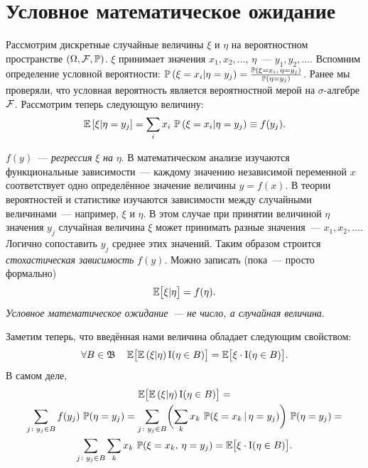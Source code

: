 \section{Условное математическое ожидание}
    Рассмотрим дискретные случайные величины $\xi$ и $\eta$ на вероятностном пространстве $(\Omega, \mathcal{F}, \operatorname{\mathbb{P}})$. 
    $\xi$ принимает значения $x_1, x_2, \dots$, $\eta$~--- $y_1, y_2, \dots$.
    Вспомним определение условной вероятности: ${\operatorname{\mathbb{P}}\left( \xi = x_i | \eta = y_j \right) = \frac{\operatorname{\mathbb{P}}\left( \xi = x_i, \, \eta = y_j\right)}{\operatorname{\mathbb{P}}\left(\eta = y_j\right)}}$.
    Ранее мы проверяли, что условная вероятность является вероятностной мерой на $\sigma$-алгебре $\mathcal{F}$.
    Рассмотрим теперь следующую величину:
    \begin{equation}
        \operatorname{\mathbb{E}} \left[ \xi | \eta = y_j \right] =
        \sum\limits_i x_i \, \operatorname{\mathbb{P}}\left(\xi = x_i | \eta = y_j \right) \equiv
        f(y_j).
        \label{cond_exp:discrete}
    \end{equation}
    
    $f(y)$~--- \textit{регрессия} $\xi$ \textit{на} $\eta$.
    В математическом анализе изучаются функциональные зависимости~--- каждому значению независимой переменной $x$ соответствует одно определённое значение величины $y = f(x)$.
    В теории вероятностей и статистике изучаются зависимости между случайными величинами~--- например, $\xi$ и $\eta$.
    В этом случае при принятии величиной $\eta$ значения $y_j$ случайная величина $\xi$ может принимать разные значения~--- $x_1, x_2, \ldots$.
    Логично сопоставить $y_j$ среднее этих значений.
    Таким образом строится \textit{стохастическая зависимость} $f(y)$.
    Можно записать (пока~--- просто формально)
    \begin{equation*}
        \operatorname{\mathbb{E}} \bigl[\xi | \eta \bigr] = f(\eta).
    \end{equation*}
    \textit{Условное математическое ожидание~--- не число, а случайная величина}.
    
    Заметим теперь, что введённая нами величина обладает следующим свойством:
    \begin{equation*}
        \forall B \in \mathfrak{B} \quad \operatorname{\mathbb{E}} \bigl[ \operatorname{\mathbb{E}} \left( \xi | \eta\right) \operatorname{\mathrm{I}}(\eta \in B)\bigr] = 
        \operatorname{\mathbb{E}} \bigl[ \xi \cdot \operatorname{\mathrm{I}}(\eta \in B) \bigr].
    \end{equation*}
    В самом деле,
    \begin{gather*}
        \operatorname{\mathbb{E}} \bigl[ \operatorname{\mathbb{E}} \left( \xi | \eta\right) \operatorname{\mathrm{I}}(\eta \in B)\bigr] = \\
        \sum\limits_{j \colon y_j \in B} f(y_j) \, \operatorname{\mathbb{P}}(\eta = y_j) = 
        \sum\limits_{j \colon y_j \in B} \biggl( \sum\limits_k x_k \, \operatorname{\mathbb{P}}(\xi = x_k \,|\, \eta = y_j) \biggr) \, \operatorname{\mathbb{P}}(\eta = y_j) = \\
        \sum\limits_{j \colon y_j \in B} \sum\limits_k x_k \, \operatorname{\mathbb{P}}(\xi = x_k, \, \eta = y_j) = 
        \operatorname{\mathbb{E}} \bigl[ \xi \cdot \operatorname{\mathrm{I}}(\eta \in B)\bigr].
    \end{gather*}

